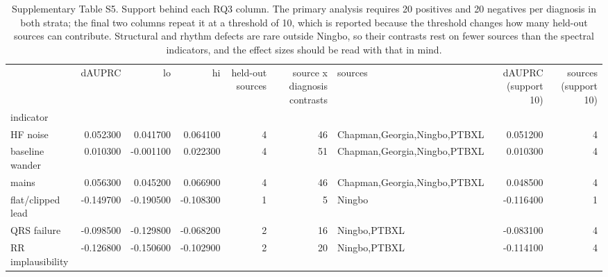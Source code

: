 \begin{table}
\caption{Supplementary Table S5. Support behind each RQ3 column. The primary analysis requires 20 positives and 20 negatives per diagnosis in both strata; the final two columns repeat it at a threshold of 10, which is reported because the threshold changes how many held-out sources can contribute. Structural and rhythm defects are rare outside Ningbo, so their contrasts rest on fewer sources than the spectral indicators, and the effect sizes should be read with that in mind.}
\begin{tabular}{lrrrrrlrr}
\toprule
 & dAUPRC & lo & hi & held-out sources & source x diagnosis contrasts & sources & dAUPRC (support 10) & sources (support 10) \\
indicator &  &  &  &  &  &  &  &  \\
\midrule
HF noise & 0.052300 & 0.041700 & 0.064100 & 4 & 46 & Chapman,Georgia,Ningbo,PTBXL & 0.051200 & 4 \\
baseline wander & 0.010300 & -0.001100 & 0.022300 & 4 & 51 & Chapman,Georgia,Ningbo,PTBXL & 0.010300 & 4 \\
mains & 0.056300 & 0.045200 & 0.066900 & 4 & 46 & Chapman,Georgia,Ningbo,PTBXL & 0.048500 & 4 \\
flat/clipped lead & -0.149700 & -0.190500 & -0.108300 & 1 & 5 & Ningbo & -0.116400 & 1 \\
QRS failure & -0.098500 & -0.129800 & -0.068200 & 2 & 16 & Ningbo,PTBXL & -0.083100 & 4 \\
RR implausibility & -0.126800 & -0.150600 & -0.102900 & 2 & 20 & Ningbo,PTBXL & -0.114100 & 4 \\
\bottomrule
\end{tabular}
\end{table}
